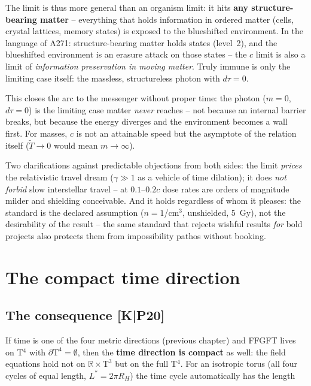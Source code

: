 The limit is thus more general than an organism limit: it hits
\textbf{any structure-bearing matter} -- everything that holds
information in ordered matter (cells, crystal lattices, memory
states) is exposed to the blueshifted environment. In the language
of A271: structure-bearing matter holds states (level~2), and the
blueshifted environment is an erasure attack on those states --
the $c$ limit is also a limit of \emph{information preservation in
moving matter}. Truly immune is only the limiting case itself: the
massless, structureless photon with $d\tau = 0$.

This closes the arc to the messenger without proper time: the
photon ($m = 0$, $d\tau = 0$) is the limiting case matter
\emph{never} reaches -- not because an internal barrier breaks,
but because the energy diverges and the environment becomes a wall
first. For masses, $c$ is not an attainable speed but the
asymptote of the relation itself ($\tilde T \to 0$ would mean
$m \to \infty$).

Two clarifications against predictable objections from both sides:
the limit \emph{prices} the relativistic travel dream
($\gamma \gg 1$ as a vehicle of time dilation); it does
\emph{not forbid} slow interstellar travel -- at $0.1$--$0.2c$
dose rates are orders of magnitude milder and shielding
conceivable. And it holds regardless of whom it pleases: the
standard is the declared assumption ($n = 1$/cm$^3$, unshielded,
5~Gy), not the desirability of the result -- the same standard
that rejects wishful results \emph{for} bold projects also
protects them from impossibility pathos without booking.

\chapter{The compact time direction}

\section{The consequence [K|P20]}

If time is one of the four metric directions (previous chapter) and
FFGFT lives on T$^4$ with $\partial\text{T}^4 = \emptyset$, then the
\textbf{time direction is compact} as well: the field equations
hold not on $\mathbb{R}\times\text{T}^3$ but on the full T$^4$. For
an isotropic torus (all four cycles of equal length,
$L^{*} = 2\pi R_H$) the time cycle automatically has the length

